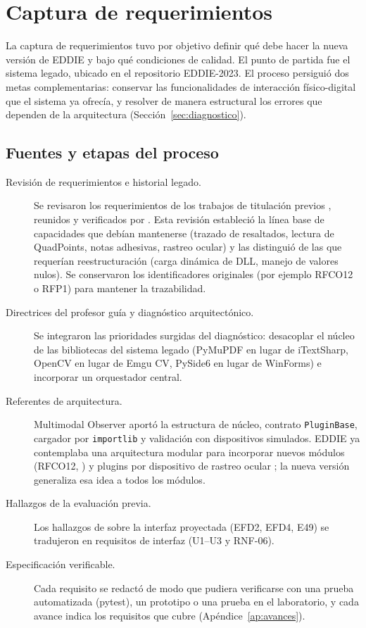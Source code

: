 \section{Captura de requerimientos}

La captura de requerimientos tuvo por objetivo definir qué debe hacer la nueva versión de EDDIE y bajo qué condiciones de calidad. El punto de partida fue el sistema legado, ubicado en el repositorio EDDIE-2023. El proceso persiguió dos metas complementarias: conservar las funcionalidades de interacción físico-digital que el sistema ya ofrecía, y resolver de manera estructural los errores que dependen de la arquitectura (Sección~\ref{sec:diagnostico}).

\subsection{Fuentes y etapas del proceso}

\begin{description}
  \item[Revisión de requerimientos e historial legado.] Se revisaron los requerimientos de los trabajos de titulación previos \citep{carrasco2017,contreras2019,montanares2019,pezoa2020,estay2020,santibanez2020}, reunidos y verificados por \citet{ibaceta2023}. Esta revisión estableció la línea base de capacidades que debían mantenerse (trazado de resaltados, lectura de QuadPoints, notas adhesivas, rastreo ocular) y las distinguió de las que requerían reestructuración (carga dinámica de DLL, manejo de valores nulos). Se conservaron los identificadores originales (por ejemplo RFCO12 o RFP1) para mantener la trazabilidad.
  \item[Directrices del profesor guía y diagnóstico arquitectónico.] Se integraron las prioridades surgidas del diagnóstico: desacoplar el núcleo de las bibliotecas del sistema legado (PyMuPDF en lugar de iTextSharp, OpenCV en lugar de Emgu CV, PySide6 en lugar de WinForms) e incorporar un orquestador central.
  \item[Referentes de arquitectura.] Multimodal Observer \citep{figueroa2025} aportó la estructura de núcleo, contrato \texttt{PluginBase}, cargador por \texttt{importlib} y validación con dispositivos simulados. EDDIE ya contemplaba una arquitectura modular para incorporar nuevos módulos (RFCO12, \citealp{contreras2019}) y plugins por dispositivo de rastreo ocular \citep{estay2020}; la nueva versión generaliza esa idea a todos los módulos.
  \item[Hallazgos de la evaluación previa.] Los hallazgos de \citet{ibaceta2023} sobre la interfaz proyectada (EFD2, EFD4, E49) se tradujeron en requisitos de interfaz (U1--U3 y RNF-06).
  \item[Especificación verificable.] Cada requisito se redactó de modo que pudiera verificarse con una prueba automatizada (pytest), un prototipo o una prueba en el laboratorio, y cada avance indica los requisitos que cubre (Apéndice~\ref{ap:avances}).
\end{description}

